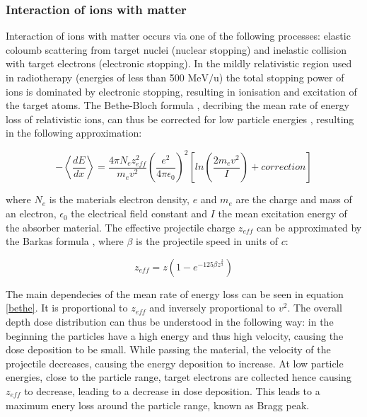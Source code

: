 \documentclass[type=dr, dr=rernat, accentcolor=tud7b,colorbacktitle, bigchapter, openright, twoside, 12pt ]{tudthesis}
\begin{document}

\subsubsection{Interaction of ions with matter}

Interaction of ions with matter occurs via one of the following processes: elastic coloumb scattering from target nuclei (nuclear stopping) 
and inelastic collision with target electrons (electronic stopping). In the mildly relativistic region used in radiotherapy 
(energies of less than 500 $\mathrm{MeV}/\mathrm{u}$) the total stopping power of ions is dominated by electronic stopping, 
resulting in ionisation and excitation of the target atoms. 
The Bethe-Bloch formula \cite{Bet30} \cite{Blo33}, decribing the mean rate of energy loss of relativistic ions, can thus be corrected 
for low particle energies \cite{Nak10}, resulting in the following approximation:

\begin{equation}
- \left \langle \frac{dE}{dx} \right \rangle = \frac{ 4 \pi N_{e} z_{eff}^{2} }{ m_{e} v^{2} } \left( \frac{e^{2}}{4\pi \epsilon_{0}} \right) ^{2} \left[ln \left( \frac{2m_{e}v^{2}}{I} \right)+correction \right]
 \label{bethe}
\end{equation}

where $N_{e}$ is the materials electron density, $e$ and $m_{e}$ are the charge and mass 
of an electron, $\epsilon_{0}$ the electrical field constant and $I$ the mean excitation energy of the absorber material. The effective 
projectile charge $z_{eff}$ can be approximated by the Barkas formula \cite{Bar63}, where $\beta$ is the projectile speed in units of 
$c$: 

\vspace*{-0.8cm}
\begin{equation}
 z_{eff} = z \left( 1 - e^{-125 \beta z^{\frac{2}{3}}} \right)
\end{equation}

The main dependecies of the mean rate of energy loss can be seen in equation \ref{bethe}. It is proportional to $z_{eff}$ 
and inversely proportional to $v^{2}$. The overall depth dose distribution can thus be understood in the following way: in the beginning 
the particles have a high energy and thus high velocity, causing the dose deposition to be small. While passing the material, the velocity 
of the projectile decreases, causing the energy deposition to increase. At low particle energies, close to the particle range, 
target electrons are collected hence causing $z_{eff}$ to decrease, leading to a decrease in dose deposition. This leads to a maximum 
enery loss around the particle range, known as Bragg peak. 
\end{document}
